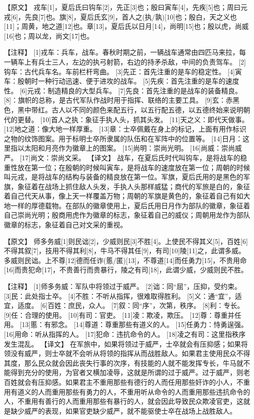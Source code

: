 \documentclass[a4paper,12pt,UTF8,twoside]{ctexbook}
\begin{document}
【原文】
戎车[1]，夏后氏曰钩车[2]，先正[3]也；殷曰寅车[4]，先疾[5]也；周曰元戎[6]，先良[7]也。旗[8]，夏后氏玄[9]，首人之(执/孰)[10]也；殷白，天之义也[11]；周黄，地之道[12]也。章[13]，夏后氏以日月[14]，尚明[15]也；殷以虎，尚威[16]也；周以龙，尚文[17]也。



【注释】
[1]戎车：兵车，战车。春秋时期之前，一辆战车通常由四匹马来拉，每一辆车上有兵士三人，左边的执弓射箭，右边的持矛杀敌，中间的负责驾车。
[2]钩车：古代兵车名。车前栏杆弯曲。
[3]先正：首先注重的是车的稳定性。
[4]寅车：殷朝时一种行动迅速、便于进攻的战车。
[5]先疾：首先注重的是车的速度性。
[6]元戎：制造精良的大型兵车。
[7]先良：首先注重的是战车的装备精良。
[8]：旗帜的总称，是古代军队作战时用于指挥、联络的主要工具。
[9]玄：赤黑色，黑中带红。古人以不同的颜色来配五行，以五行配五德，以五德终始来说明朝代的更替。
[10]首人之执：象征手执人头，抓其头发。
[11]天之义：即代天做事。
[12]地之道：像大地一样厚重。
[13]章：士卒佩戴在身上的标记，上面有用作标识之物的纹饰图案。用于标明士卒所隶属的队伍和在军阵中的位置等。
[14]日月：这里指以太阳和月亮作为徽章上的图案。
[15]尚明：崇尚光明。
[16]尚威：崇尚威严。
[17]尚文：崇尚文采。
【译文】
战车，在夏后氏时代叫钩车，是将战车的稳重性放在第一位；在殷朝的时候叫寅车，是将战车的速度放在第一位；周朝的时候叫元戎，是将战车的结构与装备的精良放在第一位。军旗，夏后氏用的是黑色的军旗，象征着在战场上抓住敌人头发，手执人头那样威猛；商代的军旅是白的，象征着自己代天从事，像上天一样覆盖万物；周朝的军旗是黄色的，象征着自己有如大地一样的厚德载物。在部队的徽章使用上，夏后氏用日月作为部队的徽章，象征着自己崇尚光明；殷商用虎作为徽章的标志，象征着自己的威仪；周朝用龙作为部队徽章的标志，象征着自己对文采的重视。

【原文】
师多务威[1]则民诎[2]，少威则民[3]不胜[4]。上使民不得其义[5]，百姓[6]不得其叙[7]，技用不得其利[8]，牛马不得其任[9]，有司[10]陵[11]之，此谓多威。多威则民诎。上不尊[12]德而任诈(慝/匿)[13]，不尊道[14]而任勇力[15]，不贵用命[16]而贵犯命[17]，不贵善行而贵暴行，陵之有司[18]，此谓少威，少威则民不胜。


【注释】
[1]师多务威：军队中将领过于威严。
[2]诎：同“屈”，压抑，受约束。
[3]民：此处指士卒。
[4]不胜：不听从指挥，很难取得胜利。
[5]义：通“宜”，适宜，适度。
[6]百姓：庶民，众人。
[7]叙：同“序”，次第，秩序。
[8]利：专长。
[9]任：合理的使用。
[10]有司：官吏。
[11]凌：欺凌，欺压。
[12]尊：尊重并任用。
[13]慝：有邪念。
[14]尊道：尊重那些有道义的人。
[15]任勇力：恃勇逞强。
[16]用命：听从指挥的人。
[17]犯命：违抗命令的人。
[18]凌之有司：这里指秩序发生混乱。
【译文】
在军旅中，如果将领过于威严，士卒就会有压抑感；如果将领没有威严，则士卒就不会听从将领的指挥从而战胜敌人。如果君主使用民众不得其度，那么民众就会因此丧失行事的次序，有技能的人就不能发挥专长，牛马就不能得到充分的使用，为官者又横加凌辱，这就是所谓的过于威严。过于威严，则老百姓就会有压抑感。如果君主不重用那些有德行的人而任用那些奸诈的小人，不重用有道义的人而重用那些有勇力的人，不重用听从命令的人而重用那些违抗命令的人，不重用有善行的人而重用那些有暴行的人，就会因此导致民众欺凌官吏，这就是缺少威严的表现，如果官吏缺少威严，就不能驱使士卒在战场上战胜敌人。
\end{document}
